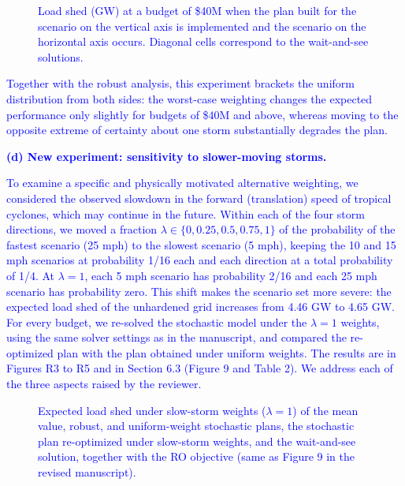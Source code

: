 \documentclass[authoryear,preprint,review,12pt]{elsarticle}\usepackage{amssymb}
\begin{document}
\begin{figure}[htbp]
\centering
\caption{\textcolor{blue}{Load shed (GW) at a budget of \$40M when the plan built for the scenario on the vertical axis is implemented and the scenario on the horizontal axis occurs. Diagonal cells correspond to the wait-and-see solutions.}}
\label{fig:r2}
\end{figure}

\textcolor{blue}{Together with the robust analysis, this experiment brackets the uniform distribution from both sides: the worst-case weighting changes the expected performance only slightly for budgets of \$40M and above, whereas moving to the opposite extreme of certainty about one storm substantially degrades the plan.}

\medskip
\textcolor{blue}{\textbf{(d) New experiment: sensitivity to slower-moving storms.}}

\textcolor{blue}{To examine a specific and physically motivated alternative weighting, we considered the observed slowdown in the forward (translation) speed of tropical cyclones, which may continue in the future. Within each of the four storm directions, we moved a fraction $\lambda \in \{0, 0.25, 0.5, 0.75, 1\}$ of the probability of the fastest scenario (25 mph) to the slowest scenario (5 mph), keeping the 10 and 15 mph scenarios at probability 1/16 each and each direction at a total probability of 1/4. At $\lambda = 1$, each 5 mph scenario has probability 2/16 and each 25 mph scenario has probability zero. This shift makes the scenario set more severe: the expected load shed of the unhardened grid increases from 4.46 GW to 4.65 GW. For every budget, we re-solved the stochastic model under the $\lambda = 1$ weights, using the same solver settings as in the manuscript, and compared the re-optimized plan with the plan obtained under uniform weights. The results are in Figures R3 to R5 and in Section 6.3 (Figure 9 and Table 2). We address each of the three aspects raised by the reviewer.}

\begin{figure}[htbp]
\centering
\caption{\textcolor{blue}{Expected load shed under slow-storm weights ($\lambda = 1$) of the mean value, robust, and uniform-weight stochastic plans, the stochastic plan re-optimized under slow-storm weights, and the wait-and-see solution, together with the RO objective (same as Figure 9 in the revised manuscript).}}
\label{fig:r3}
\end{figure}
\end{document}
